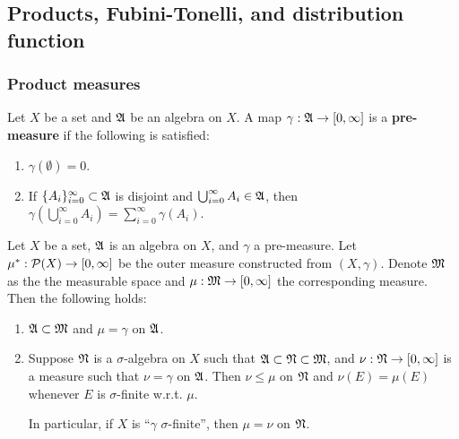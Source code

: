 \documentclass[a4paper]{article}
\renewcommand{\cupinfi}{\bigcup_{i=0}^\infty}
\renewcommand{\suminfi}{\sum_{i=0}^\infty}
\renewcommand{\seqinfi}[1]{\{ #1 \}_{i=0}^\infty}
\begin{document}
\subsection{Products, Fubini-Tonelli, and distribution 
function}

\subsubsection{Product measures}

\begin{defi}
Let $X$ be a set and $\mathfrak{A}$ be an algebra on $X$. A map
$\gamma: \mathfrak{A} \to [0, \infty]$ is a \textbf{pre-measure}
if the following is satisfied:
\begin{enumerate}
  \item $\gamma(\emptyset) = 0$.
  \item If $\seqinfi{A_i} \subset \afk$ is disjoint and
  $\cupinfi A_i \in \afk$, then $\gamma \left( \cupinfi A_i \right)
  = \suminfi \gamma(A_i)$.
\end{enumerate}

\end{defi}

\begin{thm}
Let $X$ be a set, $\mathfrak{A}$ is an algebra on $X$, and
$\gamma$ a pre-measure. Let $\mu^* : \mathcal{P} (X) \to [0, \infty]$
be the outer measure constructed from $(X, \gamma)$.
Denote $\mathfrak{M}$ as the the measurable space and
$\mu: \mathfrak{M} \to [0, \infty]$ the corresponding measure.
Then the following holds:
\begin{enumerate}
  \item $\mathfrak{A} \subset \mathfrak{M}$ and $\mu = \gamma$ on $\mathfrak{A}$.

  \item Suppose $\mathfrak{N}$ is a $\sigma$-algebra on $X$
  such that $\mathfrak{A} \subset \mathfrak{N} \subset \mathfrak{M}$, and
  $\nu: \mathfrak{N} \to [0, \infty]$ is a measure such that
  $\nu = \gamma$ on $\mathfrak{A}$. Then $\nu \leq \mu$ on $\mathfrak{N}$
  and $\nu(E) = \mu(E)$ whenever $E$ is $\sigma$-finite
  w.r.t. $\mu$.

  In particular, if $X$ is ``$\gamma$ $\sigma$-finite'',
  then $\mu = \nu$ on $\mathfrak{N}$.
\end{enumerate}
\end{thm}
\end{document}
